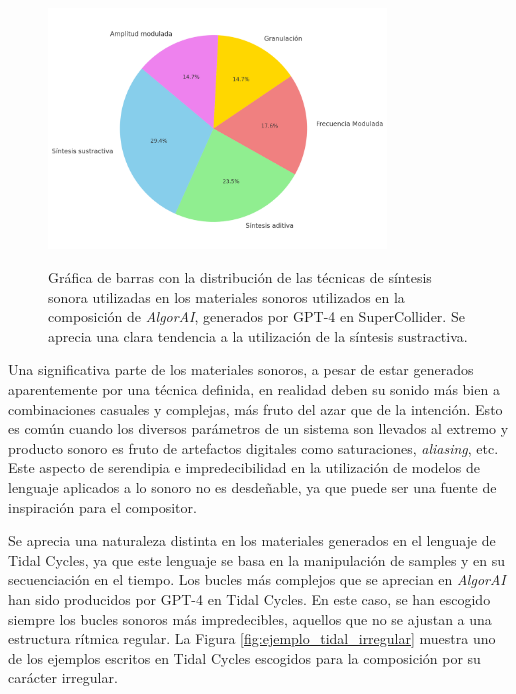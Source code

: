 \begin{figure}[H]
    \caption[Gráfica circular con la distribución de las técnicas de síntesis sonora utilizadas en los materiales sonoros generados por GPT-4 en SuperCollider]{Gráfica de barras con la distribución de las técnicas de síntesis sonora utilizadas en los materiales sonoros utilizados en la composición de \textit{AlgorAI}, generados por GPT-4 en SuperCollider. Se aprecia una clara tendencia a la utilización de la síntesis sustractiva.}
    \centering
    \includegraphics[width=0.8\textwidth]{./figuras/grafica_sintesis_gpt4_quesitos.png}
    \source{\propio}
    \label{fig:grafica_sintesis_gpt4}
\end{figure}

Una significativa parte de los materiales sonoros, a pesar de estar generados aparentemente por una técnica definida, en realidad deben su sonido más bien a combinaciones casuales y complejas, más fruto del azar que de la intención. Esto es común cuando los diversos parámetros de un sistema son llevados al extremo y producto sonoro es fruto de artefactos digitales como saturaciones, \textit{aliasing}, etc. Este aspecto de serendipia e impredecibilidad en la utilización de modelos de lenguaje aplicados a lo sonoro no es desdeñable, ya que puede ser una fuente de inspiración para el compositor.

Se aprecia una naturaleza distinta en los materiales generados en el lenguaje de Tidal Cycles, ya que este lenguaje se basa en la manipulación de samples y en su secuenciación en el tiempo. Los bucles más complejos que se aprecian en \textit{AlgorAI} han sido producidos por GPT-4 en Tidal Cycles. En este caso, se han escogido siempre los bucles sonoros más impredecibles, aquellos que no se ajustan a una estructura rítmica regular. La Figura \ref{fig:ejemplo_tidal_irregular} muestra uno de los ejemplos escritos en Tidal Cycles escogidos para la composición por su carácter irregular.


